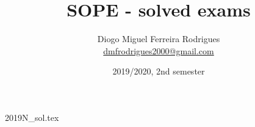 \documentclass[a4paper]{article}
\title{SOPE - solved exams}
\author{Diogo Miguel Ferreira Rodrigues \\ \href{mailto:dmfrodrigues2000@gmail.com}{dmfrodrigues2000@gmail.com}}
\date{2019/2020, 2nd semester}
\begin{document}
\begingroup
	\maketitle
	\let\clearpage\relax
	\setcounter{tocdepth}{2}
	\tableofcontents
\endgroup
{2019N_sol.tex}
\end{document}
